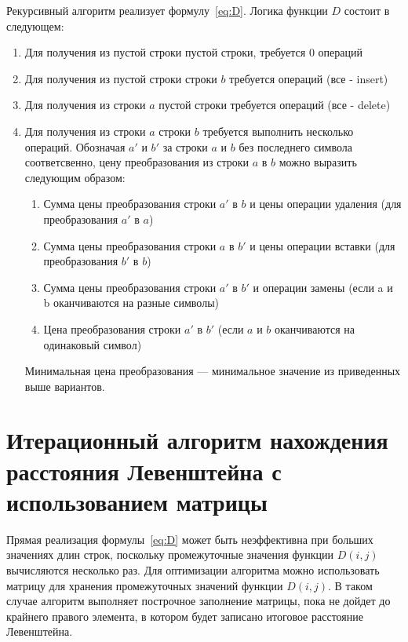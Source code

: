 \documentclass[12pt]{report}
\begin{document}
    Рекурсивный алгоритм реализует формулу~\ref{eq:D}.
    Логика функции $D$ состоит в следующем:
    \begin{enumerate}
        \item Для получения из пустой строки пустой строки, требуется 0 операций
        \item Для получения из пустой строки строки $b$ требуется  операций (все - insert)
        \item Для получения из строки $a$ пустой строки требуется  операций (все - delete)
        \item Для получения из строки $a$ строки $b$ требуется выполнить несколько операций.
        Обозначая $a'$ и $b'$ за строки $a$ и $b$ без последнего символа соответсвенно, цену преобразования
        из строки $a$ в $b$ можно выразить следующим образом:
        \begin{enumerate}
            \item Сумма цены преобразования строки $a'$ в $b$ и цены операции удаления (для преобразования $a'$ в $a$)
            \item Сумма цены преобразования строки $a$ в $b'$ и цены операции вставки (для преобразования $b'$ в $b$)
            \item Сумма цены преобразования строки $a'$ в $b'$ и операции замены
            (если a и b оканчиваются на разные символы)
            \item Цена преобразования строки $a'$ в $b'$ (если $a$ и $b$ оканчиваются на одинаковый символ)
        \end{enumerate}
        Минимальная цена преобразования --- минимальное значение из приведенных выше вариантов.
    \end{enumerate}


    \section{Итерационный алгоритм нахождения расстояния Левенштейна с использованием матрицы}
    Прямая реализация формулы~\ref{eq:D} может быть неэффективна при больших значениях длин строк,
    поскольку промежуточные значения функции $D(i, j)$ вычисляются несколько раз.
    Для оптимизации алгоритма можно использовать матрицу для хранения промежуточных значений функции $D(i, j)$.
    В таком случае алгоритм выполняет построчное заполнение матрицы, пока не дойдет до крайнего правого элемента,
    в котором будет записано итоговое расстояние Левенштейна.
\end{document}
